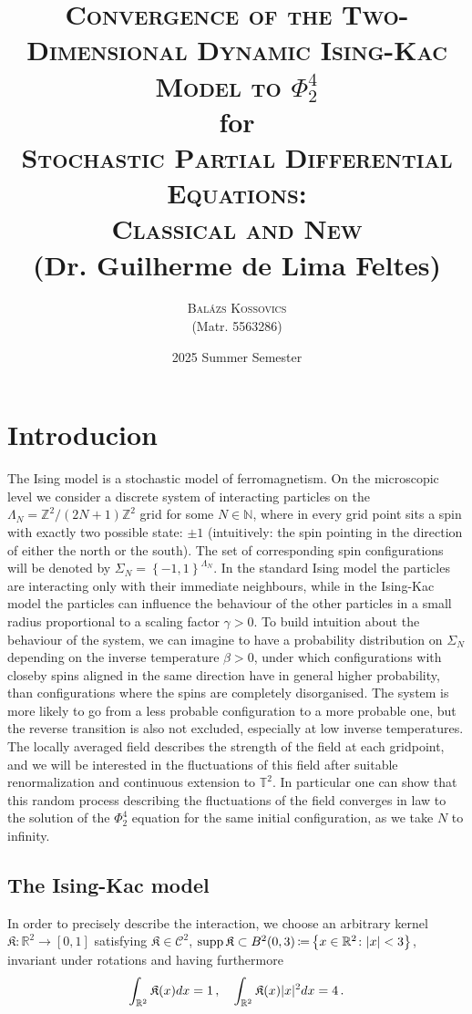 \documentclass{report}
\title{\textsc{Convergence of the Two-Dimensional Dynamic Ising-Kac Model to $\Phi^4_2$}
\\[1.5em]
{\small {for}}\\[1.5em]
{\Large \textsc{Stochastic Partial Differential Equations: \\Classical and New}}\\
{\large (Dr. Guilherme de Lima Feltes)}}
\author{
    \textsc{Balázs Kossovics}\\
    {\small (Matr. 5563286)}
}
\date{2025 Summer Semester}
\newcommand{\ZZ}{\mathbb{Z}}
\newcommand{\NN}{\mathbb{N}}
\newcommand{\RR}{\mathbb{R}}
\newcommand{\TT}{\mathbb{T}}
\DeclarePairedDelimiter\abs{\lvert}{\rvert} %
\DeclareMathOperator{\DefiningEquality}{\coloneqq}
\DeclareMathOperator{\Support}{supp}
\theoremstyle{remark}
\theoremstyle{definition}
\begin{document}
\maketitle

\newpage
\setcounter{page}{2}

\tableofcontents

\chapter{Introducion}
The Ising model is a stochastic model of ferromagnetism. On the microscopic level we consider a discrete system of interacting particles on the $\Lambda_N = \ZZ^2 / (2N+1)\ZZ^2$ grid for some $N \in \NN$, where in every grid point sits a spin with exactly two possible state: $\pm1$ (intuitively: the spin pointing in the direction of either the north or the south). The set of corresponding spin configurations will be denoted by $\Sigma_N = \left\{-1, 1\right\}^{\Lambda_N}$. In the standard Ising model the particles are interacting only with their immediate neighbours, while in the Ising-Kac model the particles can influence the behaviour of the other particles in a small radius proportional to a scaling factor $\gamma > 0$. To build intuition about the behaviour of the system, we can imagine to have a probability distribution on $\Sigma_N$ depending on the inverse temperature $\beta > 0$, under which configurations with closeby spins aligned in the same direction have in general higher probability, than configurations where the spins are completely disorganised. The system is more likely to go from a less probable configuration to a more probable one, but the reverse transition is also not excluded, especially at low inverse temperatures. The locally averaged field describes the strength of the field at each gridpoint, and we will be interested in the fluctuations of this field after suitable renormalization and continuous extension to $\TT^2$. In particular one can show that this random process describing the fluctuations of the field converges in law to the solution of the $\Phi^4_2$ equation for the same initial configuration, as we take $N$ to infinity.

\section{The Ising-Kac model}
In order to precisely describe the interaction, we choose an arbitrary kernel $\mathfrak{K}: \RR^2 \to [0, 1]$ satisfying $\mathfrak{K} \in \mathcal{C}^2$, $\Support{\mathfrak{K}} \subset B^2(0, 3) \DefiningEquality \left\{x \in \RR^2 \colon \abs{x} < 3\right\}$, invariant under rotations and having furthermore $$\int_{\RR^2} \mathfrak{K}(x) dx = 1\,,\quad \int_{\RR^2} \mathfrak{K}(x) \abs{x}^2 dx = 4\,.$$
\end{document}
